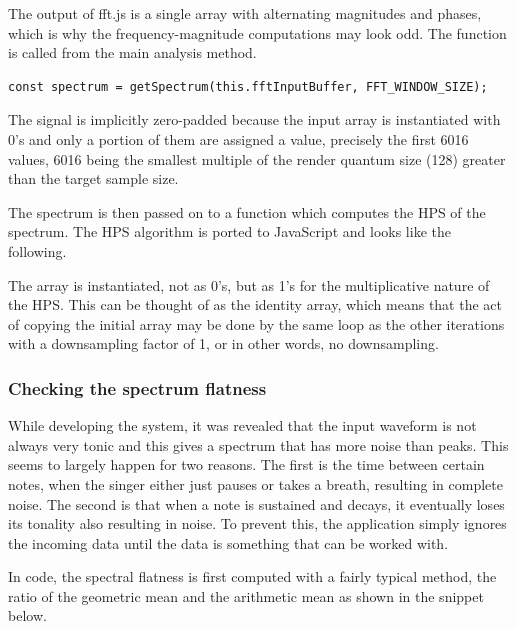 

The output of fft.js is a single array with alternating magnitudes and phases, which is why the frequency-magnitude computations may look odd. The function is called from the main analysis method.

\begin{lstlisting}[style=javascript]
    const spectrum = getSpectrum(this.fftInputBuffer, FFT_WINDOW_SIZE);
\end{lstlisting}

The signal is implicitly zero-padded because the input array is instantiated with 0's and only a portion of them are assigned a value, precisely the first 6016 values, 6016 being the smallest multiple of the render quantum size (128) greater than the target sample size.

The spectrum is then passed on to a function which computes the HPS of the spectrum. The HPS algorithm is ported to JavaScript and looks like the following. 



The array is instantiated, not as 0's, but as 1's for the multiplicative nature of the HPS. This can be thought of as the identity array, which means that the act of copying the initial array may be done by the same loop as the other iterations with a downsampling factor of 1, or in other words, no downsampling.

\subsubsection{Checking the spectrum flatness}
While developing the system, it was revealed that the input waveform is not always very tonic and this gives a spectrum that has more noise than peaks. This seems to largely happen for two reasons. The first is the time between certain notes, when the singer either just pauses or takes a breath, resulting in complete noise. The second is that when a note is sustained and decays, it eventually loses its tonality also resulting in noise. To prevent this, the application simply ignores the incoming data until the data is something that can be worked with. 

In code, the spectral flatness is first computed with a fairly typical method, the ratio of the geometric mean and the arithmetic mean as shown in the snippet below.



